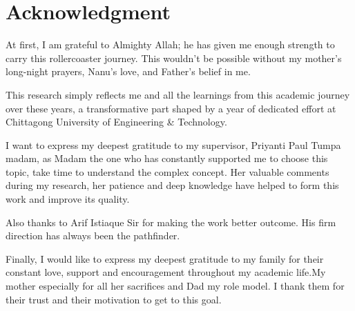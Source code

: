 \setcounter{secnumdepth}{-1}
\section{\hfil Acknowledgment \hfil}
\vspace{1cm}
\thispagestyle{front}

At first, I am grateful to Almighty Allah; he has given me enough strength to carry this rollercoaster journey. This wouldn't be possible without my mother's long-night prayers, Nanu's love, and Father's belief in me.

This research simply reflects me and all the learnings from this academic journey over these years, a transformative part shaped by a year of dedicated
effort at Chittagong University of Engineering \& Technology.


I want to express  my deepest gratitude to my supervisor, Priyanti Paul Tumpa madam, as Madam the one who has constantly supported me to choose this topic, take time to understand the complex concept. Her valuable comments during my research, her patience and deep knowledge have helped to form this work and improve its quality.


Also thanks to Arif Istiaque Sir for making the work better outcome. His firm direction has always been the pathfinder.

Finally, I would like to express my deepest gratitude to my family for their constant love, support and encouragement throughout my academic life.My mother especially for all her sacrifices and Dad my role model. I thank them for their trust and their motivation to get to this goal.

\setcounter{secnumdepth}{3}

\clearpage